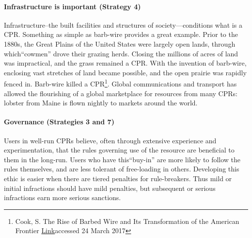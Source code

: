 \documentclass[amstex,12pt]{book}
\begin{document}
\paragraph{Infrastructure is important (Strategy 4)}
Infrastructure--the built facilities and structures of society---conditions what is a CPR. Something as simple as barb-wire provides a great example. Prior to the 1880s, the Great Plains of the United States were largely open lands, through which``cowmen'' drove their grazing herds. Closing the millions of acres of land was impractical, and the grass remained a CPR. With the invention of barb-wire, enclosing vast stretches of land became possible, and the open prairie was rapidly fenced in. Barb-wire killed a CPR\footnote{Cook, S. The Rise of Barbed Wire and Its Transformation of the American Frontier \href{http://xroads.virginia.edu/~class/am485_98/cook/develp2.htm}{Link}accessed 24 March 2017}. Global communications and transport has allowed the flourishing of a global marketplace for resources from many CPRs: lobster from Maine is flown nightly to markets around the world.\\

\paragraph{Governance (Strategies 3 and 7)}
Users in well-run CPRs believe, often through extensive experience and experimentation, that the rules governing use of the resource are beneficial to them in the long-run. Users who have this``buy-in'' are more likely to follow the rules themselves, and are less tolerant of free-loading in others. Developing this ethic is easier when there are tiered penalties for rule-breakers. Thus mild or initial infractions should have mild penalties, but subsequent or serious infractions earn more serious sanctions.\\
\end{document}
